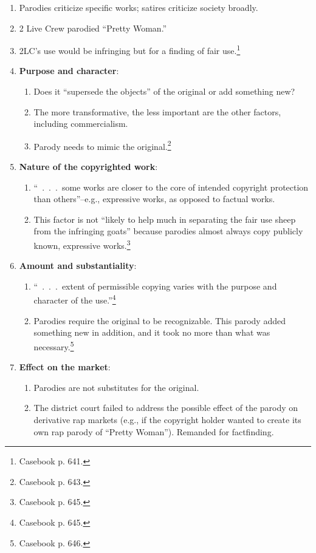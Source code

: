 \begin{enumerate}
    \item Parodies criticize specific works; satires criticize society 
    broadly.
    \item 2 Live Crew parodied ``Pretty Woman.''
    \item 2LC's use would be infringing but for a finding of fair 
    use.\footnote{Casebook p. 641.}
    \item \textbf{Purpose and character}:
    \begin{enumerate}
        \item Does it ``supersede the objects'' of the original or add 
        something new?
        \item The more transformative, the less important are the other 
        factors, including commercialism.
        \item Parody needs to mimic the original.\footnote{Casebook p. 643.}
    \end{enumerate}
    \item \textbf{Nature of the copyrighted work}:
    \begin{enumerate}
        \item ``~.~.~.~some works are closer to the core of intended copyright 
        protection than others''--e.g., expressive works, as opposed to 
        factual works.
        \item This factor is not ``likely to help much in separating the fair 
        use sheep from the infringing goats'' because parodies almost always 
        copy publicly known, expressive works.\footnote{Casebook p. 645.}
    \end{enumerate}
    \item \textbf{Amount and substantiality}:
    \begin{enumerate}
        \item ``~.~.~.~extent of permissible copying varies with the purpose 
        and character of the use.''\footnote{Casebook p. 645.}
        \item Parodies require the original to be recognizable. This parody 
        added something new in addition, and it took no more than what was 
        necessary.\footnote{Casebook p. 646.}
    \end{enumerate}
    \item \textbf{Effect on the market}:
    \begin{enumerate}
        \item Parodies are not substitutes for the original.
        \item The district court failed to address the possible effect of the 
        parody on derivative rap markets (e.g., if the copyright holder wanted 
        to create its own rap parody of ``Pretty Woman''). Remanded for 
        factfinding.
    \end{enumerate}
\end{enumerate}

